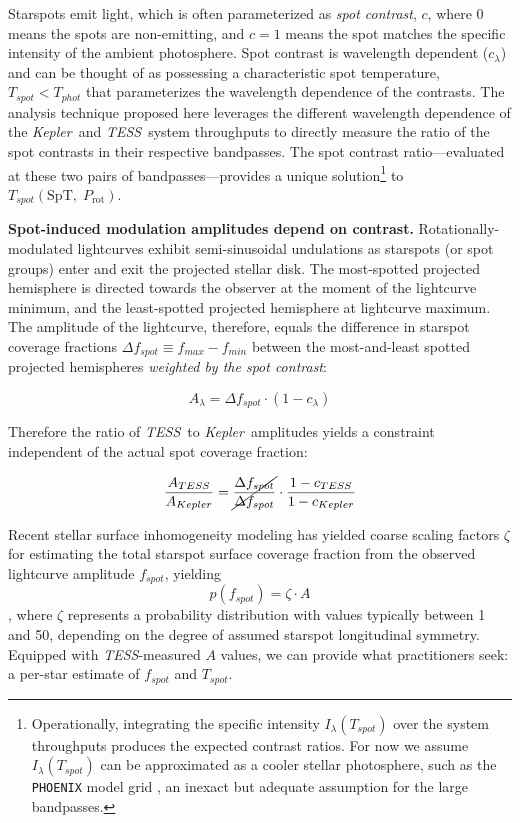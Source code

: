 \documentclass[letterpaper,11pt]{article}
\newcommand{\tess}{{\it TESS}}
\newcommand{\kepler}{{\it Kepler}}
\begin{document}
Starspots emit light, which is often parameterized as \emph{spot contrast}, $c$, where 0 means the spots are non-emitting, and $c=1$ means the spot matches the specific intensity of the ambient photosphere.  Spot contrast is wavelength dependent ($c_\lambda$) and can be thought of as possessing a characteristic spot temperature, $T_{spot}<T_{phot}$ that parameterizes the wavelength dependence of the contrasts.  The analysis technique proposed here leverages the different wavelength dependence of the \kepler\ and \tess\ system throughputs to directly measure the ratio of the spot contrasts in their respective bandpasses.  The spot contrast ratio---evaluated at these two pairs of bandpasses---provides a unique solution\footnote{Operationally, integrating the specific intensity $I_\lambda(T_{spot})$ over the system throughputs produces the expected contrast ratios.  For now we assume $I_\lambda(T_{spot})$ can be approximated as a cooler stellar photosphere, such as the \texttt{PHOENIX} model grid \citep{2013A&A...553A...6H}, an inexact but adequate assumption for the large bandpasses.} to $T_{spot}(\mathrm{SpT},\;P_{\mathrm{rot}})$.

\textbf{Spot-induced modulation amplitudes depend on contrast.}
Rotationally-modulated lightcurves exhibit semi-sinusoidal undulations as starspots (or spot groups) enter and exit the projected stellar disk.  The most-spotted projected hemisphere is directed towards the observer at the moment of the lightcurve minimum, and the least-spotted projected hemisphere at lightcurve maximum.  The amplitude of the lightcurve, therefore, equals the difference in starspot coverage fractions $\Delta f_{spot} \equiv f_{max}-f_{min}$ between the most-and-least spotted projected hemispheres \emph{weighted by the spot contrast}:

$$ A_\lambda = \Delta f_{spot} \cdot (1-c_\lambda)$$

Therefore the ratio of \tess\ to \kepler\ amplitudes yields a constraint independent of the actual spot coverage fraction:

$$ \frac{A_{TESS}}{A_{Kepler}} = \cancel{\frac{\Delta f_{spot}}{\Delta f_{spot}}} \cdot \frac{1-c_{TESS}}{1-c_{Kepler}} $$

Recent stellar surface inhomogeneity modeling \citep{2018ApJ...853..122R, 2018ApJ...868..143G, 2018ApJ...865..142B} has yielded coarse scaling factors $\zeta$ for estimating the total starspot surface coverage fraction from the observed lightcurve amplitude $f_{spot}$, yielding $$ p(f_{spot}) = \zeta \cdot A $$, where $\zeta$ represents a probability distribution with values typically between 1 and 50, depending on the degree of assumed starspot longitudinal symmetry.  Equipped with \tess-measured $A$ values, we can provide what practitioners seek: a per-star estimate of $f_{spot}$ and $T_{spot}$.
\end{document}
